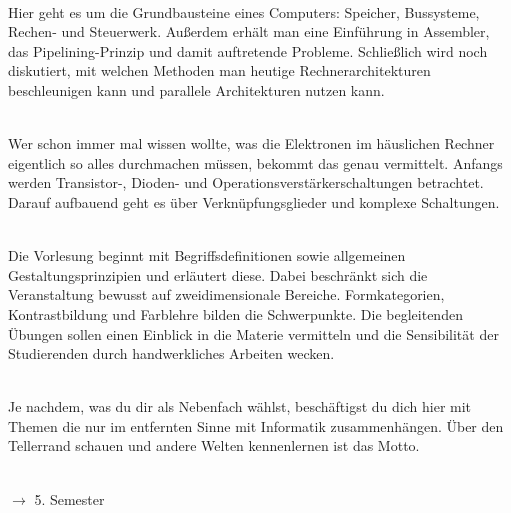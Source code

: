 \textbf{} \\
Hier geht es um die Grundbausteine eines Computers:
Speicher, Bussysteme, Rechen- und Steuerwerk.
Außerdem erhält man eine Einführung in Assembler, das Pipelining-Prinzip und damit auftretende Probleme.
Schließlich wird noch diskutiert, mit welchen Methoden man heutige Rechnerarchitekturen beschleunigen kann und parallele Architekturen nutzen kann.

\textbf{} \\
Wer schon immer mal wissen wollte, was die Elektronen im häuslichen Rechner eigentlich so alles durchmachen müssen, bekommt das genau vermittelt.
Anfangs werden Transistor-, Dioden- und Operationsverstärkerschaltungen betrachtet.
Darauf aufbauend geht es über Verknüpfungsglieder und komplexe Schaltungen.

\textbf{} \\
Die Vorlesung beginnt mit Begriffsdefinitionen sowie allgemeinen Gestaltungsprinzipien und erläutert diese.
Dabei beschränkt sich die Veranstaltung bewusst auf zweidimensionale Bereiche.
Formkategorien, Kontrastbildung und Farblehre bilden die Schwerpunkte.
Die begleitenden Übungen sollen einen Einblick in die Materie vermitteln und die Sensibilität der Studierenden durch handwerkliches Arbeiten wecken.

\textbf{} \\
Je nachdem, was du dir als Nebenfach wählst, beschäftigst du dich hier mit Themen die nur im entfernten Sinne mit Informatik zusammenhängen.
Über den Tellerrand schauen und andere Welten kennenlernen ist das Motto.

\textbf{} \\
$\rightarrow$ 5. Semester

